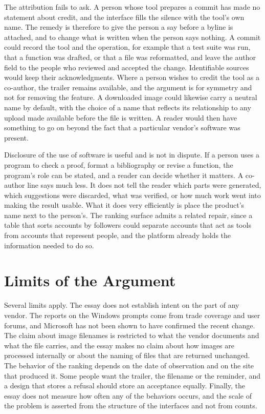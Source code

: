 \documentclass[11pt]{article}
\begin{document}
The attribution fails to ask. A person whose tool prepares a commit has made no statement about credit, and the interface fills the silence with the tool's own name. The remedy is therefore to give the person a say before a byline is attached, and to change what is written when the person says nothing. A commit could record the tool and the operation, for example that a test suite was run, that a function was drafted, or that a file was reformatted, and leave the author field to the people who reviewed and accepted the change. Identifiable sources would keep their acknowledgments. Where a person wishes to credit the tool as a co-author, the trailer remains available, and the argument is for symmetry and not for removing the feature. A downloaded image could likewise carry a neutral name by default, with the choice of a name that reflects its relationship to any upload made available before the file is written. A reader would then have something to go on beyond the fact that a particular vendor's software was present.

Disclosure of the use of software is useful and is not in dispute. If a person uses a program to check a proof, format a bibliography or revise a function, the program's role can be stated, and a reader can decide whether it matters. A co-author line says much less. It does not tell the reader which parts were generated, which suggestions were discarded, what was verified, or how much work went into making the result usable. What it does very efficiently is place the product's name next to the person's. The ranking surface admits a related repair, since a table that sorts accounts by followers could separate accounts that act as tools from accounts that represent people, and the platform already holds the information needed to do so.

\section{Limits of the Argument}

Several limits apply. The essay does not establish intent on the part of any vendor. The reports on the Windows prompts come from trade coverage and user forums, and Microsoft has not been shown to have confirmed the recent change. The claim about image filenames is restricted to what the vendor documents and what the file carries, and the essay makes no claim about how images are processed internally or about the naming of files that are returned unchanged. The behavior of the ranking depends on the date of observation and on the site that produced it. Some people want the trailer, the filename or the reminder, and a design that stores a refusal should store an acceptance equally. Finally, the essay does not measure how often any of the behaviors occurs, and the scale of the problem is asserted from the structure of the interfaces and not from counts.
\end{document}
